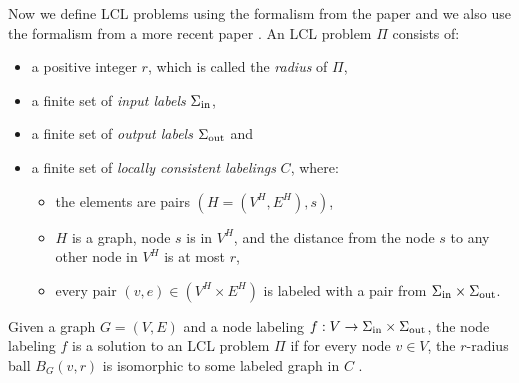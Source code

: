 Now we define LCL problems using the formalism from the paper \cite{DBLP:journals/siamcomp/NaorS95} and we also use the formalism from a more recent paper \cite{DBLP:journals/corr/abs-2105-05574}.
An LCL problem $\Pi$ consists of:
\begin{itemize}
  \item a positive integer $r$, which is called the \emph{radius} of $\Pi$,
  \item a finite set of \emph{input labels} $\Sigma_{\text{in}}$,
  \item a finite set of \emph{output labels} $\Sigma_{\text{out}}$ and
  \item a finite set of \emph{locally consistent labelings} $C$, where:
  \begin{itemize}
    \item the elements are pairs $(H=(V^H, E^H), s)$,
    \item $H$ is a graph, node $s$ is in $V^H$, and the distance from the node $s$ to any other node in $V^H$ is at most $r$,
    \item every pair $(v, e) \in (V^H \times E^H)$ is labeled with a pair from $\Sigma_{\text{in}} \times \Sigma_{\text{out}}$.
  \end{itemize}
\end{itemize}
Given a graph $G = (V, E)$ and a node labeling $f: V \rightarrow \Sigma_{\text{in}} \times \Sigma_{\text{out}}$, the node labeling $f$ is a solution to an LCL problem $\Pi$ if for every node $v \in V$, the $r$-radius ball $B_G(v, r)$ is isomorphic to some labeled graph in $C$ \cite{DBLP:journals/corr/abs-2105-05574}.

